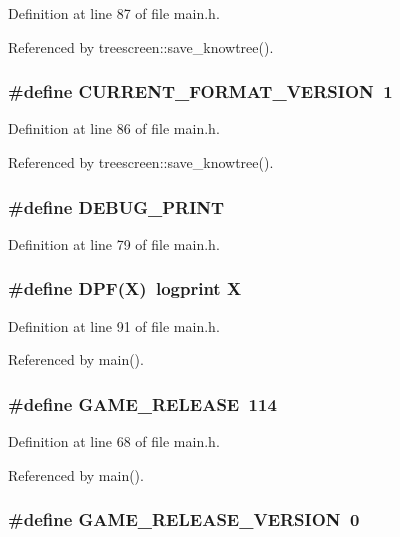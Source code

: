 Definition at line 87 of file main.h.

Referenced by treescreen::save\_\-knowtree().
\subsubsection{\setlength{\rightskip}{0pt plus 5cm}\#define CURRENT\_\-FORMAT\_\-VERSION~1}\label{main_8h_13494493ae4a0f9ce61e04759b1666b4}




Definition at line 86 of file main.h.

Referenced by treescreen::save\_\-knowtree().
\subsubsection{\setlength{\rightskip}{0pt plus 5cm}\#define DEBUG\_\-PRINT}\label{main_8h_d5aeca1a1a793c8ba18f85cbac89e768}




Definition at line 79 of file main.h.
\subsubsection{\setlength{\rightskip}{0pt plus 5cm}\#define DPF(X)~logprint X}\label{main_8h_ae074830d7dd3260e034d3acb8479e92}




Definition at line 91 of file main.h.

Referenced by main().
\subsubsection{\setlength{\rightskip}{0pt plus 5cm}\#define GAME\_\-RELEASE~114}\label{main_8h_6b7b35a1e0fcf283c8f8ff89cf8bdf4f}




Definition at line 68 of file main.h.

Referenced by main().
\subsubsection{\setlength{\rightskip}{0pt plus 5cm}\#define GAME\_\-RELEASE\_\-VERSION~0}\label{main_8h_94dfb3fd9ca31fbe7086f0c28b1257d7}




